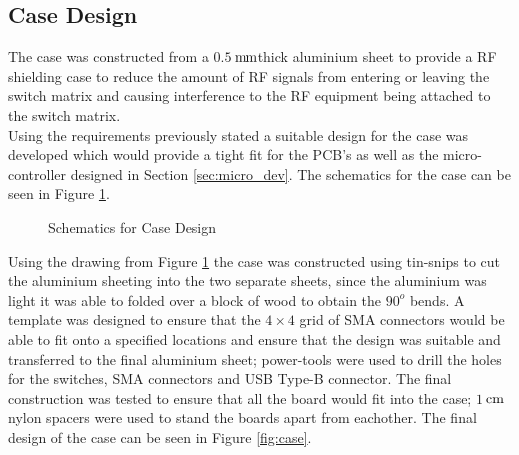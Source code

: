 \documentclass[12pt,openany,a4paper]{book}
\newcommand{\pack}	{\hspace{-0.08em}}
\newcommand{\cm}	{\ensuremath{\rm\,cm}}
\newcommand{\mm}	{\ensuremath{\rm\,m\pack m}}
\begin{document}
\subsection{Case Design}	\label{sec:casedesign}
The case was constructed from a $0.5$\mm thick aluminium sheet to provide a RF shielding case to reduce the amount of RF signals from entering or leaving the switch matrix and causing interference to the RF equipment being attached to the switch matrix.
\\[0.2cm]
Using the requirements previously stated a suitable design for the case was developed which would provide a tight fit for the PCB's as well as the micro-controller designed in Section \ref{sec:micro_dev}. The schematics for the case can be seen in Figure \ref{fig:case-schem}.
\begin{figure}[H]
	\centering
	\caption{Schematics for Case Design}
	\label{fig:case-schem}
\end{figure} 
Using the drawing from Figure \ref{fig:case-schem} the case was constructed using tin-snips to cut the aluminium sheeting into the two separate sheets, since the aluminium was light it was able to folded over a block of wood to obtain the $90^o$ bends. A template was designed to ensure that the $4\times 4$ grid of SMA connectors would be able to fit onto a specified locations and ensure that the design was suitable and transferred to the final aluminium sheet;  power-tools were used to drill the holes for the switches, SMA connectors and USB Type-B connector. The final construction was tested to ensure that all the board would fit into the case; $1$\cm nylon spacers were used to stand the boards apart from eachother. The final design of the case can be seen in Figure \ref{fig:case}.
\end{document}
